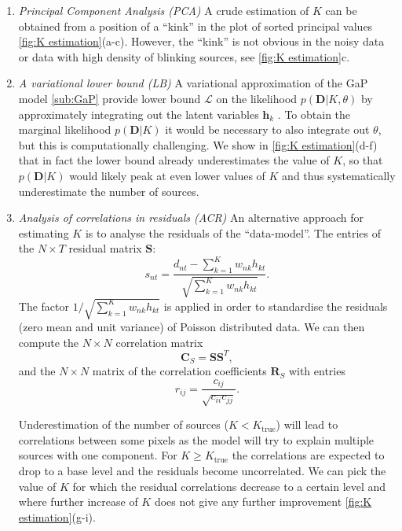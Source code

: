 \begin{enumerate}
	\item 
	\emph{Principal Component Analysis (PCA)}	
	A crude estimation of $K$ can be obtained from a position of a ``kink'' in the plot of sorted principal values \autoref{fig:K estimation}(a-c). However, the ``kink'' is not obvious in the noisy data or data with high density of blinking sources, see \autoref{fig:K estimation}c.
	\item
	\emph{A variational lower bound (LB)} 	
	A variational approximation of the GaP model \autoref{sub:GaP} provide lower bound $\mathcal{L}$ on the likelihood $p(\bm{D}|K, \theta)$ by approximately integrating out the latent variables $\bm{h}_{k}$ \cite{Buntine2006}. To obtain the marginal likelihood $p(\bm{D}|K)$ it would be necessary to also integrate out $\theta$, but this is computationally challenging. We show in \autoref{fig:K estimation}(d-f) that in fact the lower bound already underestimates the value of $K$, so that $p(\bm{D}|K)$ would likely peak at even lower values of $K$ and thus systematically underestimate the number of sources.
	
	\item 
	\emph{Analysis of correlations in residuals (ACR)}	
	An alternative approach for estimating $K$ is to analyse the residuals of the ``data-model''. The entries of the $N\times T$ residual matrix $\bm{S}$:
	\begin{equation}
		s_{nt}=\frac{d_{nt}-\sum_{k=1}^{K}w_{nk}h_{kt}}{\sqrt{\sum_{k=1}^{K}w_{nk}h_{kt}}}.
	\end{equation}
	The factor $1/\sqrt{\sum_{k=1}^{K}w_{nk}h_{kt}}$ is applied in order to standardise the residuals (zero mean and unit variance) of Poisson distributed data. We can then compute the $N\times N$ correlation matrix 
	\begin{equation}
		\bm{C}_{S}=\bm{SS}^{T},
	\end{equation}
	and the $N\times N$ matrix of the correlation coefficients $\bm{R}_{S}$ with entries 
	\begin{equation}
		r_{ij}=\frac{c_{ij}}{\sqrt{c_{ii}c_{jj}}}.
		\label{eq:Correlation in residuals}
	\end{equation}
	
	Underestimation of the number of sources ($K<K_{\mbox{true}}$) will lead to correlations between some pixels as the model will try to explain multiple sources with one component. For $K\geq K_{\mbox{true}}$ the correlations are expected to drop to a base level and the residuals become uncorrelated. We can pick the value of $K$ for which the residual correlations decrease to a certain level and where further increase of $K$ does not give any further improvement \autoref{fig:K estimation}(g-i).
\end{enumerate}
